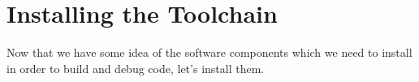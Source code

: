 \chapter{Installing the Toolchain}
Now that we have some idea of the software components which we need to install in order to build and debug code, let's install them.

